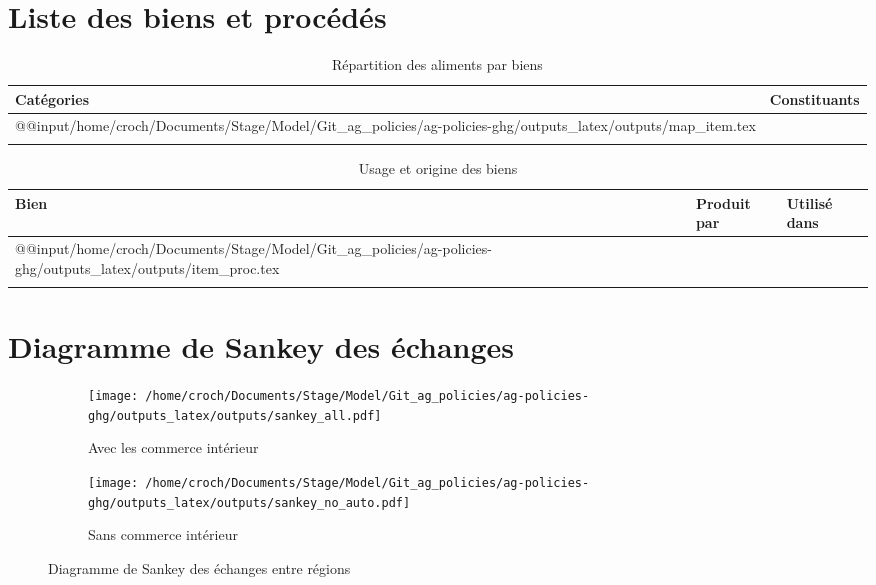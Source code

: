 \section{Liste des biens et procédés}\label{annexe:item_pord}

\begin{longtable}[h]{p{1.5in}p{4.5in}}
    \textbf{Catégories} & \textbf{Constituants} \\         \hline
    \endfirsthead
    \endhead
    \csname @@input\endcsname /home/croch/Documents/Stage/Model/Git_ag_policies/ag-policies-ghg/outputs_latex/outputs/map_item.tex
    \hline                                      \\
    \caption{Répartition des aliments par biens}
\end{longtable}

\begin{longtable}[h]{p{1.5in}p{2.5in}p{1.8in}}
    \textbf{Bien} & \textbf{Produit par} & \textbf{Utilisé dans} \\         \hline
    \endfirsthead
    \endhead
    \csname @@input\endcsname /home/croch/Documents/Stage/Model/Git_ag_policies/ag-policies-ghg/outputs_latex/outputs/item_proc.tex
    \hline                                                       \\
    \caption{Usage et origine des biens}
\end{longtable}

\section{Diagramme de Sankey des échanges}\label{annexe:sankey}
\begin{figure}[hbt!]
    \centering
    \begin{subfigure}[b]{0.495\textwidth}
        \centering
        \texttt{[image: /home/croch/Documents/Stage/Model/Git\_ag\_policies/ag-policies-ghg/outputs\_latex/outputs/sankey\_all.pdf]}
        \caption{Avec les commerce intérieur}
        \label{fig:sankey1}
    \end{subfigure}
    \begin{subfigure}[b]{0.495\textwidth}
        \centering
        \texttt{[image: /home/croch/Documents/Stage/Model/Git\_ag\_policies/ag-policies-ghg/outputs\_latex/outputs/sankey\_no\_auto.pdf]}
        \caption{Sans commerce intérieur}
        \label{fig:sankey2}
    \end{subfigure}
    \caption{Diagramme de Sankey des échanges entre régions}
    \label{fig:sankey}
\end{figure}
